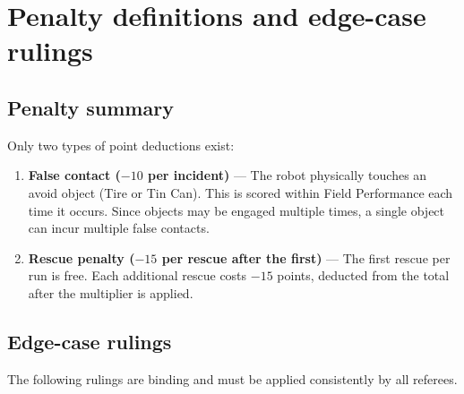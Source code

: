 \documentclass[a4]{article}
\begin{document}
\section*{Penalty definitions and edge-case rulings}
\subsection*{Penalty summary}

Only two types of point deductions exist:

\begin{enumerate}
    \item \textbf{False contact ($-10$ per incident)} --- The robot physically touches an avoid object (Tire or Tin Can). This is scored within Field Performance each time it occurs. Since objects may be engaged multiple times, a single object can incur multiple false contacts.
    \item \textbf{Rescue penalty ($-15$ per rescue after the first)} --- The first rescue per run is free. Each additional rescue costs $-15$ points, deducted from the total after the multiplier is applied.
\end{enumerate}

\pagebreak

\subsection*{Edge-case rulings}

The following rulings are binding and must be applied consistently by all referees.
\end{document}
